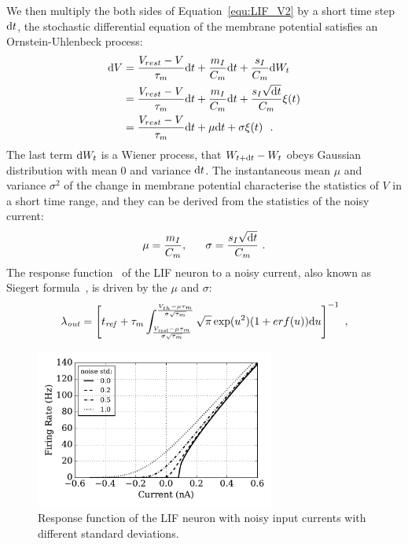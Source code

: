 	We then multiply the both sides of Equation~\ref{equ:LIF_V2} by a short time step $\mathrm{d} t$, the stochastic differential equation of the membrane potential satisfies an Ornstein-Uhlenbeck process:
	\begin{equation}
	\begin{aligned}
	\mathrm{d} V&= \frac{V_{rest} - V}{\tau_m }\mathrm{d} t + \frac{m_I}{C_m} \mathrm{d} t + \frac{s_I}{C_m}  \mathrm{d} W_t \\
	&=\frac{V_{rest} - V}{\tau_m }\mathrm{d} t + \frac{m_I}{C_m} \mathrm{d} t + \frac{s_I \sqrt{\mathrm{d} t}}{C_m} \xi(t)  \\
	&=\frac{V_{rest} - V}{\tau_m }\mathrm{d} t + \mu \mathrm{d} t + \sigma \xi(t) ~~. 
	\end{aligned}
	\end{equation}	
	The last term $\mathrm{d} W_t$ is a Wiener process, that $W_{t +\mathrm{d} t} - W_{t}$ obeys Gaussian distribution with mean 0 and variance $\mathrm{d} t$.
	The instantaneous mean $\mu$ and variance $\sigma^2$ of the change in membrane potential characterise the statistics of $V$ in a short time range, and they can be derived from the statistics of the noisy current:
	\begin{equation}
	\mu =\dfrac{m_I}{C_m}, ~~~~~ \sigma = \dfrac{s_I \sqrt{\mathrm{d} t}}{C_m}~.
	\end{equation}
	The response function~\cite{rauch2003neocortical,la2008response} of the LIF neuron to a noisy current, also known as Siegert formula~\cite{siegert1951first}, is driven by the $\mu$ and $\sigma$:
	\begin{equation}
	\lambda_\mathit{out}=
	\left [ t_\mathit{ref}+\tau_m \int_{\frac{V_\mathit{rest}-\mu \tau_m }{\sigma \sqrt{\tau_m}}}^{\frac{V_{th}-\mu \tau_m }{\sigma \sqrt{\tau_m}}} \sqrt{\pi} \exp(u^{2}) (1+erf(u)) \mathrm{d} u \right ]^{-1} ~,
	\label{equ:siegert}
	\end{equation}
	

	
	\begin{figure}[bt]
		\centering
		\includegraphics[width=0.7\textwidth]{pics_iconip/1.pdf}
		\caption{Response function of the LIF neuron with noisy input currents with different standard deviations.}
		\label{Fig:physics}
	\end{figure}
	
